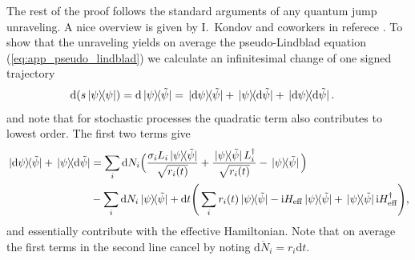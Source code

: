\documentclass[twocolumn,prl,superscriptaddress]{revtex4-2}
\renewcommand{\i}{\mathrm i}
\begin{document}
The rest of the proof follows the standard arguments of any quantum jump unraveling. A nice overview is given by I.\ Kondov and coworkers in referece \cite{IKondovMschreiber2003}. To show that the unraveling yields on average the pseudo-Lindblad equation (\ref{eq:app_pseudo_lindblad}) we calculate an infinitesimal change of one signed trajectory
\begin{align}
	\mathrm d (s \dyad{\psi}) &= \mathrm d \dyad*{\psi}{\tilde\psi} = \dyad*{\mathrm d \psi}{\tilde\psi} + \dyad*{\psi}{\mathrm d \tilde \psi} + \dyad*{\mathrm d \psi}{\mathrm d \tilde \psi}.
\end{align}
and note that for stochastic processes the quadratic term also contributes to lowest order. The first two terms give
\begin{align}
	\begin{split}
		\dyad*{\mathrm d \psi}{\tilde\psi} + \dyad*{\psi}{\mathrm d \tilde \psi} &= \sum_i \mathrm dN_i \Big(\frac{\sigma_i L_i \dyad*{ \psi}{\tilde\psi} }{\sqrt{ r_i(t)}} + \frac{\dyad*{ \psi}{\tilde\psi} L_i^\dagger  }{\sqrt{ r_i(t)}} - \dyad*{ \psi}{\tilde\psi} \Big) \\ & - \sum_i \mathrm dN_i \dyad*{ \psi}{\tilde\psi}+ \mathrm dt \Bigg(\sum_i  r_i(t) \dyad*{ \psi}{\tilde\psi} - \i H_\mathrm{eff} \dyad*{ \psi}{\tilde\psi} + \dyad*{ \psi}{\tilde\psi}\i H_\mathrm{eff}^\dagger \Bigg) ,
	\end{split}
	\label{eq:app_hermitianterms}
\end{align}
and essentially contribute with the effective Hamiltonian. Note that on average the first terms in the second line cancel by noting $\overline{\mathrm d N_i} = r_i\mathrm d t$.
\end{document}
